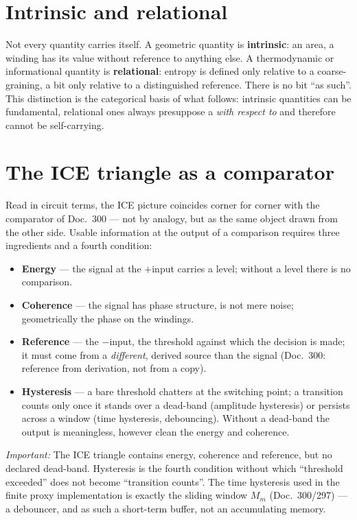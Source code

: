 \section{Intrinsic and relational}

Not every quantity carries itself. A geometric quantity is \textbf{intrinsic}:
an area, a winding has its value without reference to anything else. A
thermodynamic or informational quantity is \textbf{relational}: entropy is
defined only relative to a coarse-graining, a bit only relative to a
distinguished reference. There is no bit \enquote{as such}. This distinction is
the categorical basis of what follows: intrinsic quantities can be fundamental,
relational ones always presuppose a \emph{with respect to} and therefore cannot
be self-carrying.

\section{The ICE triangle as a comparator}

Read in circuit terms, the ICE picture coincides corner for corner with the
comparator of Doc.~300 --- not by analogy, but as the same object drawn from the
other side. Usable information at the output of a comparison requires three
ingredients and a fourth condition:
\begin{itemize}
  \item \textbf{Energy} --- the signal at the $+$input carries a level; without
    a level there is no comparison.
  \item \textbf{Coherence} --- the signal has phase structure, is not mere
    noise; geometrically the phase on the windings.
  \item \textbf{Reference} --- the $-$input, the threshold against which the
    decision is made; it must come from a \emph{different}, derived source than
    the signal (Doc.~300: reference from derivation, not from a copy).
  \item \textbf{Hysteresis} --- a bare threshold chatters at the switching
    point; a transition counts only once it stands over a dead-band (amplitude
    hysteresis) or persists across a window (time hysteresis, debouncing).
    Without a dead-band the output is meaningless, however clean the energy and
    coherence.
\end{itemize}
\emph{Important:} The ICE triangle contains energy, coherence and reference, but
no declared dead-band. Hysteresis is the fourth condition without which
\enquote{threshold exceeded} does not become \enquote{transition counts}. The
time hysteresis used in the finite proxy implementation is exactly the sliding
window $M_m$ (Doc.~300/297) --- a debouncer, and as such a short-term buffer, not
an accumulating memory.

